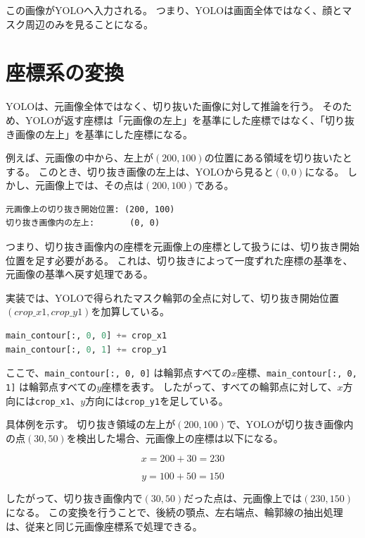 \documentclass[uplatex,dvipdfmx]{jsarticle}
\begin{document}
この画像がYOLOへ入力される。
つまり、YOLOは画面全体ではなく、顔とマスク周辺のみを見ることになる。

\section{座標系の変換}

YOLOは、元画像全体ではなく、切り抜いた画像に対して推論を行う。
そのため、YOLOが返す座標は「元画像の左上」を基準にした座標ではなく、「切り抜き画像の左上」を基準にした座標になる。

例えば、元画像の中から、左上が$(200, 100)$の位置にある領域を切り抜いたとする。
このとき、切り抜き画像の左上は、YOLOから見ると$(0, 0)$になる。
しかし、元画像上では、その点は$(200, 100)$である。

\begin{lstlisting}
元画像上の切り抜き開始位置: (200, 100)
切り抜き画像内の左上:       (0, 0)
\end{lstlisting}

つまり、切り抜き画像内の座標を元画像上の座標として扱うには、切り抜き開始位置を足す必要がある。
これは、切り抜きによって一度ずれた座標の基準を、元画像の基準へ戻す処理である。

実装では、YOLOで得られたマスク輪郭の全点に対して、切り抜き開始位置$(crop\_x1, crop\_y1)$を加算している。

\begin{lstlisting}[language=Python]
main_contour[:, 0, 0] += crop_x1
main_contour[:, 0, 1] += crop_y1
\end{lstlisting}

ここで、\verb|main_contour[:, 0, 0]| は輪郭点すべての$x$座標、\verb|main_contour[:, 0, 1]| は輪郭点すべての$y$座標を表す。
したがって、すべての輪郭点に対して、$x$方向には\verb|crop_x1|、$y$方向には\verb|crop_y1|を足している。

具体例を示す。
切り抜き領域の左上が$(200, 100)$で、YOLOが切り抜き画像内の点$(30, 50)$を検出した場合、元画像上の座標は以下になる。

\begin{equation}
  x = 200 + 30 = 230
\end{equation}

\begin{equation}
  y = 100 + 50 = 150
\end{equation}

したがって、切り抜き画像内で$(30, 50)$だった点は、元画像上では$(230, 150)$になる。
この変換を行うことで、後続の顎点、左右端点、輪郭線の抽出処理は、従来と同じ元画像座標系で処理できる。
\end{document}
